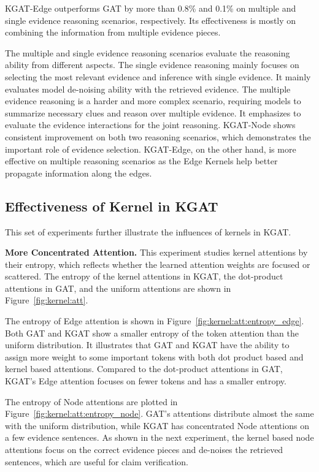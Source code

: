 \documentclass[11pt,a4paper]{article}
\begin{document}
KGAT-Edge outperforms GAT by more than 0.8\% and 0.1\% on multiple and single evidence reasoning scenarios, respectively. Its effectiveness is mostly on combining the information from multiple evidence pieces.

The multiple and single evidence reasoning scenarios evaluate the reasoning ability from different aspects. The single evidence reasoning mainly focuses on selecting the most relevant evidence and inference with single evidence. It mainly evaluates model de-noising ability with the retrieved evidence. The multiple evidence reasoning is a harder and more complex scenario, requiring models to summarize necessary clues and reason over multiple evidence. It emphasizes to evaluate the evidence interactions for the joint reasoning. KGAT-Node shows consistent improvement on both two reasoning scenarios, which demonstrates the important role of evidence selection. KGAT-Edge, on the other hand, is more effective on multiple reasoning scenarios as the Edge Kernels help better propagate information along the edges.






\subsection{Effectiveness of Kernel in KGAT}
This set of experiments further illustrate the influences of kernels in KGAT.

\textbf{More Concentrated Attention.}
This experiment studies kernel attentions by their entropy, which reflects whether the learned attention weights are focused or scattered.
The entropy of the kernel attentions in KGAT, the dot-product attentions in GAT, and the uniform attentions are shown in Figure~\ref{fig:kernel:att}.

The entropy of Edge attention is shown in Figure~\ref{fig:kernel:att:entropy_edge}. Both GAT and KGAT show a smaller entropy of the token attention than the uniform distribution. It illustrates that GAT and KGAT have the ability to assign more weight to some important tokens with both dot product based and kernel based attentions. Compared to the dot-product attentions in GAT, KGAT's Edge attention focuses on fewer tokens and has a smaller entropy.

The entropy of Node attentions are plotted in Figure~\ref{fig:kernel:att:entropy_node}. GAT's attentions distribute almost the same with the uniform distribution, while KGAT has concentrated Node attentions on a few evidence sentences. As shown in the next experiment, the kernel based node attentions focus on the correct evidence pieces and de-noises the retrieved sentences, which are useful for claim verification.
\end{document}
